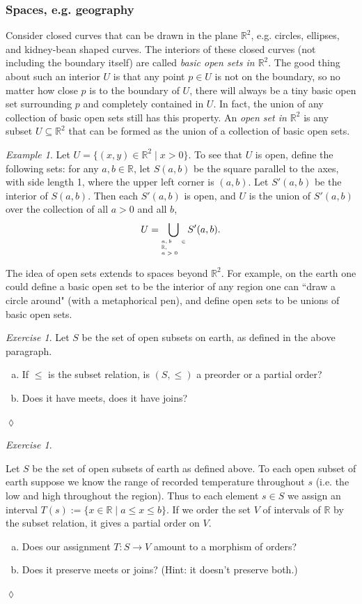 \documentclass{book}
\def\RR{{\mathbb R}}
\def\to{\rightarrow}
\def\taking{\colon}
\def\ss{\subseteq}
\def\|{{\;|\;}}
\theoremstyle{remark}
\newtheorem{example}[subsubsection]{Example}
\newtheorem{exc}[subsubsection]{Exercise}
\newenvironment{exercise}{\begin{exc}}{\hspace*{\fill}$\lozenge$\end{exc}}
\theoremstyle{definition}
\def\sexc{\begin{enumerate}[a.)]\setlength{\itemsep}{.1cm}\setlength{\parskip}{.1cm}\item}
\def\next{\item}
\def\endsexc{\end{enumerate}}
\begin{document}

\subsubsection{Spaces, e.g. geography}

Consider closed curves that can be drawn in the plane $\RR^2$, e.g. circles, ellipses, and kidney-bean shaped curves. The interiors of these closed curves (not including the boundary itself) are called {\em basic open sets in $\RR^2$}. The good thing about such an interior $U$ is that any point $p\in U$ is not on the boundary, so no matter how close $p$ is to the boundary of $U$, there will always be a tiny basic open set surrounding $p$ and completely contained in $U$. In fact, the union of any collection of basic open sets still has this property. An {\em open set in $\RR^2$} is any subset $U\ss \RR^2$ that can be formed as the union of a collection of basic open sets.

\begin{example}

Let $U=\{(x,y)\in\RR^2\|x>0\}$. To see that $U$ is open, define the following sets: for any $a,b\in\RR$, let $S(a,b)$ be the square parallel to the axes, with side length 1, where the upper left corner is $(a,b)$. Let $S'(a,b)$ be the interior of $S(a,b)$. Then each $S'(a,b)$ is open, and $U$ is the union of $S'(a,b)$ over the collection of all $a>0$ and all $b$,$$U=\bigcup_{\parbox{.35in}{\tiny$a,b\in\RR,\\~\;\;a>0$}}S'(a,b).$$ 

\end{example}

The idea of open sets extends to spaces beyond $\RR^2$. For example, on the earth one could define a basic open set to be the interior of any region one can ``draw a circle around" (with a metaphorical pen), and define open sets to be unions of basic open sets. 

\begin{exercise}
Let $S$ be the set of open subsets on earth, as defined in the above paragraph. 
\sexc If $\leq$ is the subset relation, is $(S,\leq)$ a preorder or a partial order? 
\next Does it have meets, does it have joins?
\endsexc
\end{exercise}

\begin{exercise}\label{exc:cosheaf of temps}

Let $S$ be the set of open subsets of earth as defined above. To each open subset of earth suppose we know the range of recorded temperature throughout $s$ (i.e. the low and high throughout the region). Thus to each element $s\in S$ we assign an interval $T(s):=\{x\in\RR\|a\leq x\leq b\}$. If we order the set $V$ of intervals of $\RR$ by the subset relation, it gives a partial order on $V$. 
\sexc Does our assignment $T\taking S\to V$ amount to a morphism of orders? 
\next Does it preserve meets or joins? (Hint: it doesn't preserve both.)
\endsexc
\end{exercise}
\end{document}
